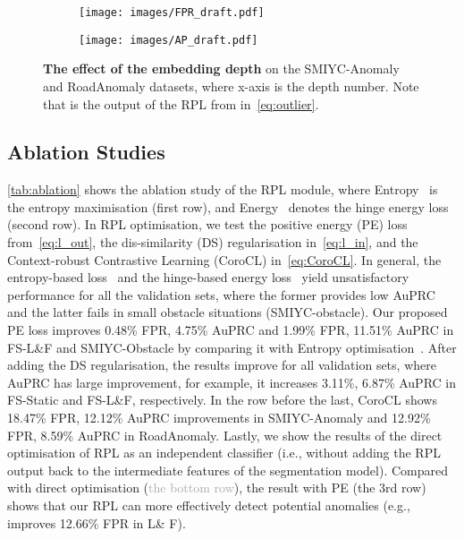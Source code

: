 \documentclass[10pt,twocolumn,letterpaper]{article}
\begin{document}
\begin{figure}[t!]
    \centering
    \begin{subfigure}[b]{0.495\linewidth}
         \centering    
            \texttt{[image: images/FPR\_draft.pdf]}
        \caption{}
        \label{fig:embed_a}
         \vspace{-7pt}
    \end{subfigure}
    \begin{subfigure}[b]{0.495\linewidth}
        \centering    
            \texttt{[image: images/AP\_draft.pdf]}
        \caption{}
        \label{fig:embed_b}
         \vspace{-7pt}
     \end{subfigure}
     \caption{\textbf{The effect of the embedding depth} on the SMIYC-Anomaly and RoadAnomaly datasets, where x-axis is the depth number. Note that  is the output of the RPL from  in~\eqref{eq:outlier}. }
     \label{fig:embedding_depth}
    \vspace{-15 pt}
\end{figure}

\subsection{Ablation Studies}

\cref{tab:ablation} shows the ablation study of the RPL module, where Entropy~\cite{chan2021entropy} is the entropy maximisation (first row), and  Energy~\cite{tian2021pixel} denotes the hinge energy loss (second row). 
In RPL optimisation, we test the positive energy (PE) loss from~\eqref{eq:l_out}, the dis-similarity (DS) regularisation  in~\eqref{eq:l_in}, and the Context-robust Contrastive Learning (CoroCL) in~\eqref{eq:CoroCL}.
In general, the entropy-based loss~\cite{chan2021entropy} and the hinge-based energy loss~\cite{tian2021pixel} yield unsatisfactory performance for all the validation sets, where the former provides low AuPRC and the latter fails in small obstacle situations (SMIYC-obstacle). Our proposed PE loss improves 0.48\% FPR, 4.75\% AuPRC and 1.99\% FPR, 11.51\% AuPRC in FS-L\&F and SMIYC-Obstacle by comparing it with Entropy optimisation~\cite{chan2021entropy}. 
After adding the DS regularisation, the results improve for all validation sets, where AuPRC has large improvement, for example, it increases 3.11\%, 6.87\%  AuPRC in FS-Static and FS-L\&F, respectively. In the row before the last, CoroCL shows 18.47\% FPR, 12.12\% AuPRC improvements in SMIYC-Anomaly and 12.92\% FPR, 8.59\% AuPRC in RoadAnomaly. Lastly, we show the results of the direct optimisation of RPL as an independent classifier (i.e., without adding the RPL output back to the intermediate features of the segmentation model). Compared with direct optimisation (\textcolor{darkgray}{the bottom row}), the result with PE (the 3rd row) shows that our RPL can more effectively detect potential anomalies (e.g.,  improves 12.66\% FPR in L\& F).
\end{document}
